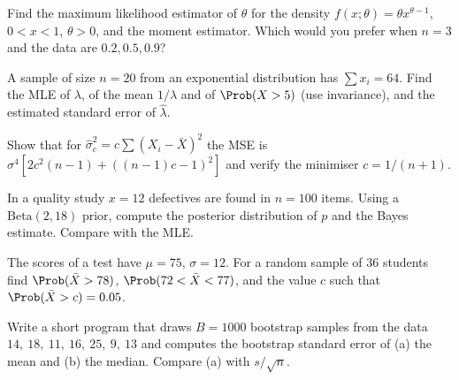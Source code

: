 \begin{exercise}
Find the maximum likelihood estimator of $\theta$ for the density $f(x;\theta)=\theta x^{\theta-1}$, $0<x<1$, $\theta>0$, and the moment estimator. Which would you prefer when $n=3$ and the data are $0.2,0.5,0.9$?
\end{exercise}

\begin{exercise}
A sample of size $n=20$ from an exponential distribution has $\sum x_i=64$. Find the MLE of $\lambda$, of the mean $1/\lambda$ and of $\Prob(X>5)$ (use invariance), and the estimated standard error of $\hat\lambda$.
\end{exercise}

\begin{exercise}
Show that for $\hat\sigma^2_c=c\sum(X_i-\bar{X})^2$ the MSE is $\sigma^4[2c^2(n-1)+((n-1)c-1)^2]$ and verify the minimiser $c=1/(n+1)$.
\end{exercise}

\begin{exercise}
In a quality study $x=12$ defectives are found in $n=100$ items. Using a $\mathrm{Beta}(2,18)$ prior, compute the posterior distribution of $p$ and the Bayes estimate. Compare with the MLE.
\end{exercise}

\begin{exercise}
The scores of a test have $\mu=75$, $\sigma=12$. For a random sample of $36$ students find $\Prob(\bar{X}>78)$, $\Prob(72<\bar{X}<77)$, and the value $c$ such that $\Prob(\bar{X}>c)=0.05$.
\end{exercise}

\begin{exercise}
Write a short program that draws $B=1000$ bootstrap samples from the data $14,\ 18,\ 11,\ 16,\ 25,\ 9,\ 13$ and computes the bootstrap standard error of (a) the mean and (b) the median. Compare (a) with $s/\sqrt n$.
\end{exercise}
